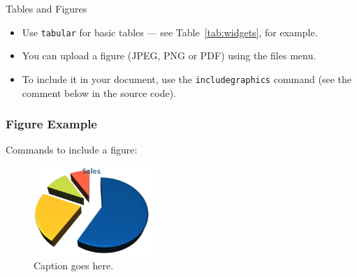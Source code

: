 \documentclass[10pt,xcolor={table,dvipsnames},t]{beamer}
\begin{document}
\begin{frame}{Tables and Figures}

\begin{itemize}
\item Use \texttt{tabular} for basic tables --- see Table~\ref{tab:widgets}, for example.
\item You can upload a figure (JPEG, PNG or PDF) using the files menu. 
\item To include it in your document, use the \texttt{includegraphics} command (see the comment below in the source code).
\end{itemize}

\end{frame}

\begin{frame}
\frametitle{Figure Example}

Commands to include a figure:

\begin{figure}
\includegraphics[width=0.4\textwidth]{chart}
\caption{\label{fig:your-figure}Caption goes here.}
\end{figure}
\end{frame}
\end{document}
